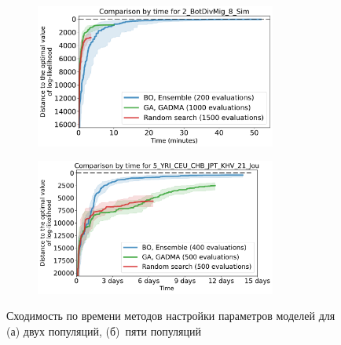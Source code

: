 \begin{figure}[ht]
    \centering
    \begin{subfigure}[b]{0.49\linewidth}
        \centering
        \includegraphics[width=0.87\textwidth]{images_experiments/bo_ga/2_BotDivMig_8_Sim_bo_ga_time.pdf}
        \caption{}
    \end{subfigure}%
    \begin{subfigure}[b]{0.49\linewidth}
        \centering
        \includegraphics[width=0.87\textwidth]{images_experiments/bo_ga/5_YRI_CEU_CHB_JPT_KHV_21_Jou_bo_ga_time.pdf}
        \caption{}
    \end{subfigure}
    \caption{Сходимость по времени методов настройки параметров моделей для (а) двух популяций, (б)~пяти популяций}
\end{figure}

